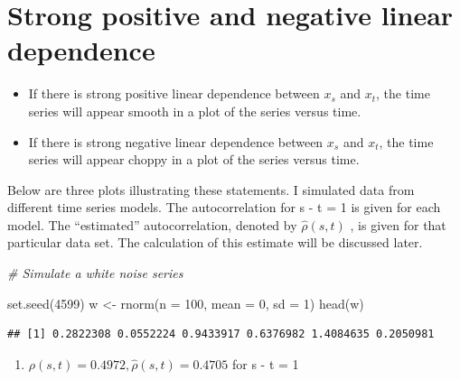 \documentclass[
]{book}
\newenvironment{Shaded}{\begin{snugshade}}{\end{snugshade}}
\newcommand{\AttributeTok}[1]{\textcolor[rgb]{0.77,0.63,0.00}{#1}}
\newcommand{\CommentTok}[1]{\textcolor[rgb]{0.56,0.35,0.01}{\textit{#1}}}
\newcommand{\DecValTok}[1]{\textcolor[rgb]{0.00,0.00,0.81}{#1}}
\newcommand{\FunctionTok}[1]{\textcolor[rgb]{0.00,0.00,0.00}{#1}}
\newcommand{\NormalTok}[1]{#1}
\newcommand{\OtherTok}[1]{\textcolor[rgb]{0.56,0.35,0.01}{#1}}
\providecommand{\tightlist}{%
  \setlength{\itemsep}{0pt}\setlength{\parskip}{0pt}}
\theoremstyle{definition}
\theoremstyle{definition}
\theoremstyle{definition}
\theoremstyle{definition}
\theoremstyle{remark}
\begin{document}
\hypertarget{strong-positive-and-negative-linear-dependence}{%
\section{Strong positive and negative linear dependence}\label{strong-positive-and-negative-linear-dependence}}

\begin{itemize}
\item
  If there is strong positive linear dependence between \(x_s\) and \(x_t\), the time series will appear smooth in a plot of the series versus time.
\item
  If there is strong negative linear dependence between \(x_s\) and \(x_t\), the time series will appear choppy in a plot of the series versus time.
\end{itemize}

Below are three plots illustrating these statements.
I simulated data from different time series models. The autocorrelation for \textbar s - t\textbar{} = 1 is given for each model. The ``estimated'' autocorrelation, denoted by \(\hat{\rho}(s,t)\) , is given for that particular data set. The calculation of this estimate will be discussed later.

\begin{Shaded}
\begin{Highlighting}[]
\CommentTok{\# Simulate a white noise series }

\FunctionTok{set.seed}\NormalTok{(}\DecValTok{4599}\NormalTok{) }
\NormalTok{w }\OtherTok{\textless{}{-}} \FunctionTok{rnorm}\NormalTok{(}\AttributeTok{n =} \DecValTok{100}\NormalTok{, }\AttributeTok{mean =} \DecValTok{0}\NormalTok{, }\AttributeTok{sd =} \DecValTok{1}\NormalTok{)}
\FunctionTok{head}\NormalTok{(w)}
\end{Highlighting}
\end{Shaded}

\begin{verbatim}
## [1] 0.2822308 0.0552224 0.9433917 0.6376982 1.4084635 0.2050981
\end{verbatim}

\begin{enumerate}
\def\labelenumi{\arabic{enumi}.}
\tightlist
\item
  \(\rho(s,t)=0.4972, \hat{\rho}(s,t)=0.4705\) for \textbar s - t\textbar{} = 1
\end{enumerate}
\end{document}

